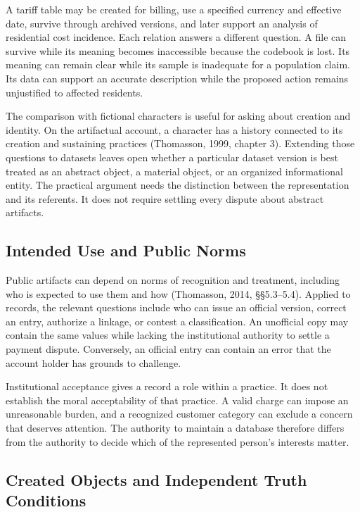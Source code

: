 A tariff table may be created for billing, use a specified currency and
effective date, survive through archived versions, and later support an
analysis of residential cost incidence. Each relation answers a
different question. A file can survive while its meaning becomes
inaccessible because the codebook is lost. Its meaning can remain clear
while its sample is inadequate for a population claim. Its data can
support an accurate description while the proposed action remains
unjustified to affected residents.

The comparison with fictional characters is useful for asking about
creation and identity. On the artifactual account, a character has a
history connected to its creation and sustaining practices (Thomasson,
1999, chapter 3). Extending those questions to datasets leaves open
whether a particular dataset version is best treated as an abstract
object, a material object, or an organized informational entity. The
practical argument needs the distinction between the representation and
its referents. It does not require settling every dispute about abstract
artifacts.

\hypertarget{M09-intended-use-and-public-norms}{%
\subsection{Intended Use and Public
Norms}\label{M09-intended-use-and-public-norms}}

\noindent Public artifacts can depend on norms of recognition and treatment,
including who is expected to use them and how (Thomasson, 2014,
§§5.3--5.4). Applied to records, the relevant questions include who can
issue an official version, correct an entry, authorize a linkage, or
contest a classification. An unofficial copy may contain the same values
while lacking the institutional authority to settle a payment dispute.
Conversely, an official entry can contain an error that the account
holder has grounds to challenge.

Institutional acceptance gives a record a role within a practice. It
does not establish the moral acceptability of that practice. A valid
charge can impose an unreasonable burden, and a recognized customer
category can exclude a concern that deserves attention. The authority to
maintain a database therefore differs from the authority to decide which
of the represented person's interests matter.

\hypertarget{M09-created-objects-and-independent-truth-conditions}{%
\subsection{Created Objects and Independent Truth
Conditions}\label{M09-created-objects-and-independent-truth-conditions}}


